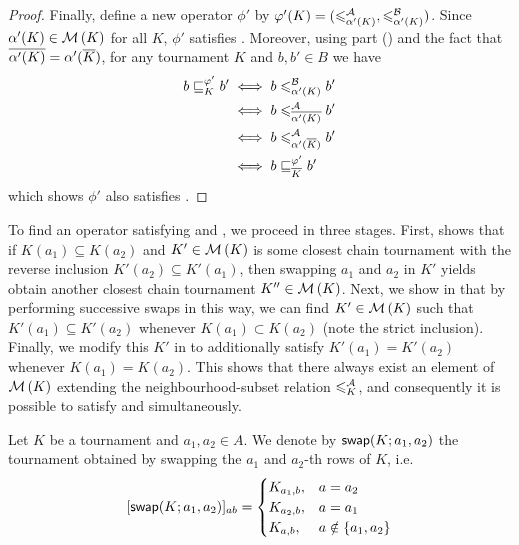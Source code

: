 \begin{proof}
    Finally, define a new operator $\phi'$ by $\varphi'(K) =
    ({\leqslant^{\mathcal{A}}_{\alpha'(K)}}, {\leqslant^{\mathcal{B}}_{\alpha'(K)}})$. Since $\alpha'(K) \in
    \operatorname{\mathcal{M}}\left({K}\right)$ for all $K$, $\phi'$ satisfies . Moreover,
    using  part
    () and the fact that ${\overline{\alpha'(K)}} =
    \alpha'({\overline{K}})$, for any tournament $K$ and $b, b' \in B$ we have
    \begin{align*}
        b \sqsubseteq_K^{\varphi'} b'
        &\iff b \leqslant^{\mathcal{B}}_{\alpha'(K)} b' \\
        &\iff b \leqslant^{\mathcal{A}}_{{\overline{\alpha'(K)}}} b' \\
        &\iff b \leqslant^{\mathcal{A}}_{\alpha'({\overline{K}})} b' \\
        &\iff b \sqsubseteq_{{\overline{K}}}^{\varphi'} b'
    \end{align*}
    which shows $\phi'$ also satisfies .
\end{proof}

To find an operator satisfying  and , we
proceed in three stages. First,  shows
that if $K(a_1) \subseteq K(a_2)$ and $K' \in \operatorname{\mathcal{M}}\left({K}\right)$ is some closest chain
tournament with the reverse inclusion $K'(a_2) \subseteq K'(a_1)$, then
swapping $a_1$ and $a_2$ in $K'$ yields obtain another closest chain tournament
$K'' \in \operatorname{\mathcal{M}}\left({K}\right)$. Next, we show in
 that by performing
successive swaps in this way, we can find $K' \in \operatorname{\mathcal{M}}\left({K}\right)$ such that $K'(a_1)
\subseteq K'(a_2)$ whenever $K(a_1) \subset K(a_2)$ (note the strict
inclusion). Finally, we modify this $K'$ in
 to additionally satisfy $K'(a_1) =
K'(a_2)$ whenever $K(a_1) = K(a_2)$.  This shows that there always exist an
element of $\operatorname{\mathcal{M}}\left({K}\right)$ extending the neighbourhood-subset relation $\leqslant^{\mathcal{A}}_K$,
and consequently it is possible to satisfy  and
 simultaneously.

\begin{definition}
    Let $K$ be a tournament and $a_1, a_2 \in A$. We denote by
    $\mathsf{swap}({K}; {a_1}, {a_2})$ the tournament obtained by swapping the $a_1$ and
    $a_2$-th rows of $K$, i.e.
    \[
        [\mathsf{swap}({K}; {a_1}, {a_2})]_{ab} = \begin{cases}
            K_{a_1,b},& a = a_2 \\
            K_{a_2,b},& a = a_1 \\
            K_{a,b},& a \notin \{a_1,a_2\}
        \end{cases}
    \]
\end{definition}

